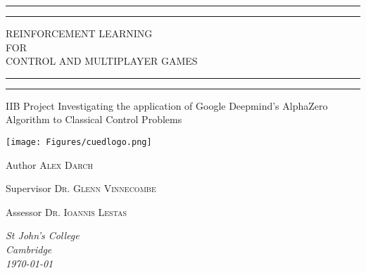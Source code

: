 \documentclass[main.tex]{subfiles}
\begin{document}
\begin{titlepage} %

	\centering %
	\scshape %
	\vspace*{\baselineskip} %
	\rule{\textwidth}{1.6pt}\vspace*{-\baselineskip}\vspace*{2pt} %
	\rule{\textwidth}{0.4pt} %
	\vspace{0.75\baselineskip} %
	
	{\LARGE REINFORCEMENT LEARNING \\ FOR \\ CONTROL AND MULTIPLAYER GAMES \\} %
	
	\vspace{0.75\baselineskip} %
	\rule{\textwidth}{0.4pt}\vspace*{-\baselineskip}\vspace{3.2pt} %
	\rule{\textwidth}{1.6pt} %
	\vspace{1\baselineskip} %
	
	
	IIB Project Investigating the application of Google Deepmind's AlphaZero Algorithm to Classical Control Problems 
	
    \vspace*{4\baselineskip} %
    \texttt{[image: Figures/cuedlogo.png]}
    \vspace*{3\baselineskip} %
	
	
	Author
	\vspace{0.5\baselineskip} %
    {\scshape\Large Alex Darch} %

    Supervisor
	\vspace{0.5\baselineskip} %
    {\scshape\Large Dr. Glenn Vinnecombe} %
    
    Assessor
	\vspace{0.5\baselineskip} %
	{\scshape\Large Dr. Ioannis Lestas} %
    	
	\vfill %
	\vspace{0.3\baselineskip} %
    \textit{St John's College \\ Cambridge \\ \today}

\end{titlepage}
\end{document}

